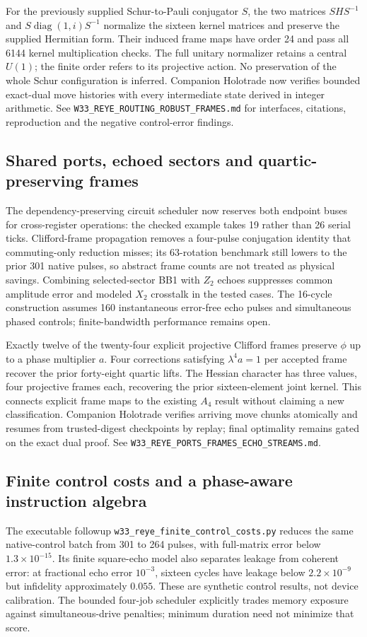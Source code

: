 For the previously supplied Schur-to-Pauli conjugator $S$, the two matrices
$SHS^{-1}$ and $S\operatorname{diag}(1,i)S^{-1}$ normalize the sixteen kernel
matrices and preserve the supplied Hermitian form.  Their induced frame maps
have order 24 and pass all 6144 kernel multiplication checks.  The full
unitary normalizer retains a central $U(1)$; the finite order refers to its
projective action.  No preservation of the whole Schur configuration is
inferred.  Companion Holotrade now verifies bounded exact-dual move histories
with every intermediate state derived in integer arithmetic.
See \texttt{W33\_REYE\_ROUTING\_ROBUST\_FRAMES.md} for interfaces, citations,
reproduction and the negative control-error findings.

\subsection{Shared ports, echoed sectors and quartic-preserving frames}
The dependency-preserving circuit scheduler now reserves both endpoint buses
for cross-register operations: the checked example takes 19 rather than 26
serial ticks. Clifford-frame propagation removes a four-pulse conjugation
identity that commuting-only reduction misses; its 63-rotation benchmark still
lowers to the prior 301 native pulses, so abstract frame counts are not treated
as physical savings. Combining selected-sector BB1 with $Z_2$ echoes suppresses
common amplitude error and modeled $X_2$ crosstalk in the tested cases. The
16-cycle construction assumes 160 instantaneous error-free echo pulses and
simultaneous phased controls; finite-bandwidth performance remains open.

Exactly twelve of the twenty-four explicit projective Clifford frames preserve
$\phi$ up to a phase multiplier $a$. Four corrections satisfying
$\lambda^4a=1$ per accepted frame recover the prior forty-eight quartic lifts.
The Hessian character has three values, four projective frames each, recovering
the prior sixteen-element joint kernel. This connects explicit frame maps to
the existing $A_4$ result without claiming a new classification.
Companion Holotrade verifies arriving move chunks atomically and resumes from
trusted-digest checkpoints by replay; final optimality remains gated on the
exact dual proof. See \texttt{W33\_REYE\_PORTS\_FRAMES\_ECHO\_STREAMS.md}.

\subsection{Finite control costs and a phase-aware instruction algebra}
The executable followup \texttt{w33\_reye\_finite\_control\_costs.py}
reduces the same native-control batch from 301 to 264 pulses, with full-matrix
error below $1.3\times10^{-15}$. Its finite square-echo model also separates
leakage from coherent error: at fractional echo error $10^{-3}$, sixteen
cycles have leakage below $2.2\times10^{-9}$ but infidelity approximately
$0.055$. These are synthetic control results, not device calibration.
The bounded four-job scheduler explicitly trades memory exposure against
simultaneous-drive penalties; minimum duration need not minimize that score.

